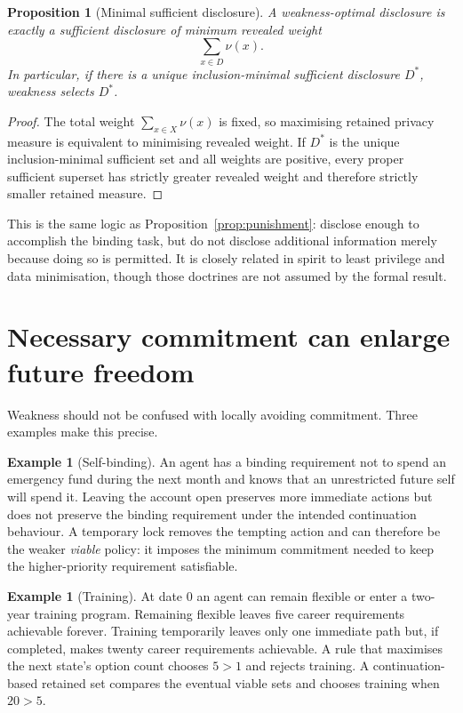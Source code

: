 \documentclass[11pt]{article}
\newtheorem{proposition}[theorem]{Proposition}
\theoremstyle{definition}
\newtheorem{example}[theorem]{Example}
\begin{document}
\begin{proposition}[Minimal sufficient disclosure]\label{prop:disclosure}
A weakness-optimal disclosure is exactly a sufficient disclosure of minimum revealed weight
\[
\sum_{x\in D}\nu(x).
\]
In particular, if there is a unique inclusion-minimal sufficient disclosure $D^*$, weakness selects $D^*$.
\end{proposition}

\begin{proof}
The total weight $\sum_{x\in X}\nu(x)$ is fixed, so maximising retained privacy measure is equivalent to minimising revealed weight. If $D^*$ is the unique inclusion-minimal sufficient set and all weights are positive, every proper sufficient superset has strictly greater revealed weight and therefore strictly smaller retained measure.
\end{proof}

This is the same logic as Proposition~\ref{prop:punishment}: disclose enough to accomplish the binding task, but do not disclose additional information merely because doing so is permitted. It is closely related in spirit to least privilege and data minimisation, though those doctrines are not assumed by the formal result.

\section{Necessary commitment can enlarge future freedom}

Weakness should not be confused with locally avoiding commitment. Three examples make this precise.

\begin{example}[Self-binding]
An agent has a binding requirement not to spend an emergency fund during the next month and knows that an unrestricted future self will spend it. Leaving the account open preserves more immediate actions but does not preserve the binding requirement under the intended continuation behaviour. A temporary lock removes the tempting action and can therefore be the weaker \emph{viable} policy: it imposes the minimum commitment needed to keep the higher-priority requirement satisfiable.
\end{example}

\begin{example}[Training]
At date 0 an agent can remain flexible or enter a two-year training program. Remaining flexible leaves five career requirements achievable forever. Training temporarily leaves only one immediate path but, if completed, makes twenty career requirements achievable. A rule that maximises the next state's option count chooses $5>1$ and rejects training. A continuation-based retained set compares the eventual viable sets and chooses training when $20>5$.
\end{example}
\end{document}
